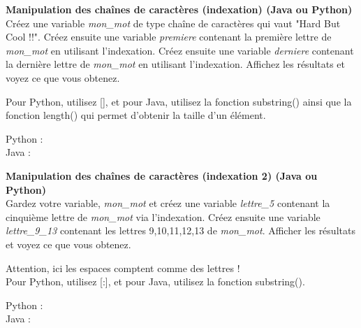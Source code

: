 \begin{Exercice}[5 minutes] \textbf{Manipulation des chaînes de caractères (indexation) (Java ou Python)}\\
   Créez une variable \textit{mon\_mot} de type chaîne de caractères qui vaut "Hard But Cool !!". Créez ensuite une variable \textit{premiere} contenant la première lettre de \textit{mon\_mot} en utilisant l'indexation. Créez ensuite une variable \textit{derniere} contenant la dernière lettre de \textit{mon\_mot} en utilisant l'indexation. Affichez les résultats et voyez ce que vous obtenez. \\
   
    \begin{conseil}
      	Pour Python, utilisez [], et pour Java, utilisez la fonction substring() ainsi que la fonction length() qui permet d'obtenir la taille d'un élément.
        
    \end{conseil}
    \begin{solution}
    
    Python : \\
    
    
    
    Java : \\
    
    
           
    \end{solution}   
\end{Exercice}

\begin{Exercice}[5 minutes] \textbf{Manipulation des chaînes de caractères (indexation 2) (Java ou Python)}\\
   Gardez votre variable, \textit{mon\_mot} et créez une variable \textit{lettre\_5} contenant la cinquième lettre de \textit{mon\_mot} via l'indexation. Créez ensuite une variable \textit{lettre\_9\_13} contenant les lettres 9,10,11,12,13 de \textit{mon\_mot}. Afficher les résultats et voyez ce que vous obtenez.  \\
   
    \begin{conseil}
      	Attention, ici les espaces comptent comme des lettres ! \\

		Pour Python, utilisez [:], et pour Java, utilisez la fonction substring().
        
    \end{conseil}
    \begin{solution}
    
    Python : \\
    
    
    
    Java : \\
    
    
           
    \end{solution}   
\end{Exercice}

